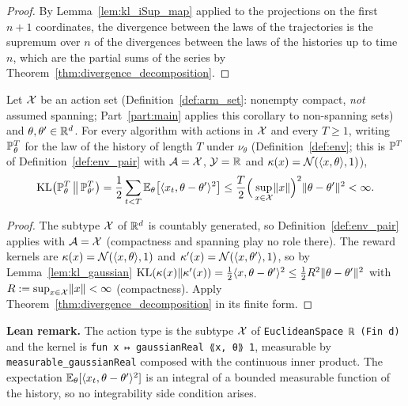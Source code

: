 \begin{proof}
\leanok
{}
By Lemma~\ref{lem:kl_iSup_map} applied to the projections on the first $n+1$ coordinates, the
divergence between the laws of the trajectories is the supremum over $n$ of the divergences
between the laws of the histories up to time $n$, which are the partial sums of the series by
Theorem~\ref{thm:divergence_decomposition}.
\end{proof}

\begin{corollary}
\label{cor:divergence_decomposition_gaussian}
\leanok
{}
Let $\mathcal{X}$ be an action set (Definition~\ref{def:arm_set}: nonempty compact, \emph{not}
assumed spanning; Part~\ref{part:main} applies this corollary to non-spanning sets) and
$\theta,\theta'\in\mathbb{R}^d$. For every
algorithm with actions in $\mathcal{X}$ and every $T \ge 1$, writing $\mathbb{P}_\theta^T$ for the law of the
history of length $T$ under $\nu_\theta$ (Definition~\ref{def:env}; this is $\mathbb{P}^T$ of
Definition~\ref{def:env_pair} with $\mathcal{A} = \mathcal{X}$, $\mathcal{Y} = \mathbb{R}$ and
$\kappa(x) = \mathcal{N}(\langle x, \theta \rangle,1)$),
\[
  \mathrm{KL}\big(\mathbb{P}_\theta^T\,\big\|\,\mathbb{P}_{\theta'}^T\big)
  = \frac12\sum_{t<T}\mathbb{E}_\theta\big[\langle x_t, \theta-\theta' \rangle^2\big]
  \le \frac{T}{2}\Big(\sup_{x\in\mathcal{X}}\lVert x \rVert\Big)^2\lVert \theta-\theta' \rVert^2 < \infty .
\]
\end{corollary}

\begin{proof}
\leanok
{}
The subtype $\mathcal{X}$ of $\mathbb{R}^d$ is countably generated, so Definition~\ref{def:env_pair}
applies with $\mathcal{A} = \mathcal{X}$ (compactness and spanning play no role there). The reward
kernels are $\kappa(x) = \mathcal{N}(\langle x, \theta \rangle,1)$ and
$\kappa'(x) = \mathcal{N}(\langle x, \theta' \rangle,1)$, so by Lemma~\ref{lem:kl_gaussian}
$\mathrm{KL}(\kappa(x)\|\kappa'(x)) = \tfrac12\langle x, \theta-\theta' \rangle^2 \le \tfrac12 R^2\lVert \theta-\theta' \rVert^2$
with $R := \sup_{x\in\mathcal{X}}\lVert x \rVert < \infty$ (compactness). Apply
Theorem~\ref{thm:divergence_decomposition} in its finite form.
\end{proof}

\textbf{Lean remark.} The action type is the subtype $\mathcal{X}$ of \texttt{EuclideanSpace ℝ (Fin d)}
and the kernel is \texttt{fun x ↦ gaussianReal ⟪x, θ⟫ 1}, measurable by
\texttt{measurable\_gaussianReal} composed with the continuous inner product. The expectation
$\mathbb{E}_\theta[\langle x_t, \theta-\theta' \rangle^2]$ is an integral of a bounded measurable function of the
history, so no integrability side condition arises.
